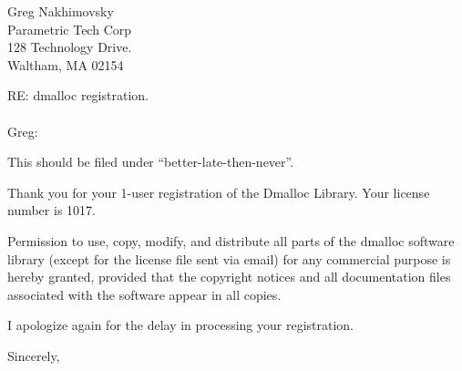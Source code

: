 

%
%

%
%
\address{Dmalloc Software \\
826 Savannah Ave. \\
Pittsburgh, PA  15221-3446 \\
1.412.244.8827}

\signature{Gray Watson \\
gray@letters.com}

\date{February 10, 1998}


\begin{letter}{Greg Nakhimovsky \\
Parametric Tech Corp \\
128 Technology Drive. \\
Waltham, MA  02154}

\opening{RE: dmalloc registration. \\
 \\
Greg:}

This should be filed under ``better-late-then-never''.

Thank you for your 
1-user registration of the Dmalloc Library.  Your license number is
1017.

Permission to use, copy, modify, and distribute all parts of the
dmalloc software library (except for the license file sent via email)
for any commercial purpose is hereby granted, provided that the
copyright notices and all documentation files associated with the
software appear in all copies.

I apologize again for the delay in processing your registration.

\closing{Sincerely,}

\end{letter}

